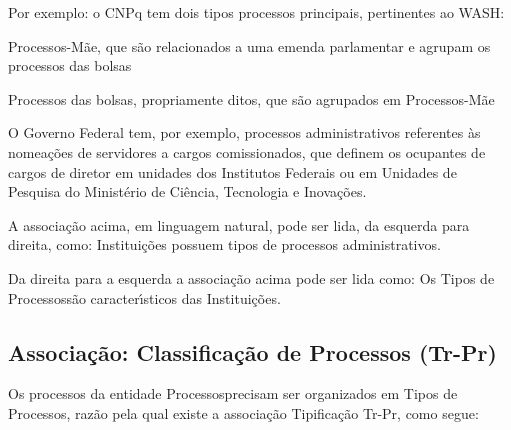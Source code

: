 \documentclass[
12pt,		%
openright,	%
twoside,  %
a4paper,			%
chapter=TITLE,		%
english,			%
french,				%
spanish,			%
brazil				%
]{USPSC-classe/USPSC}
\begin{document}
Por exemplo: o CNPq tem dois tipos processos principais, pertinentes ao WASH:










\begin{alineas}
\item Processos-M\~ae, que s\~ao relacionados a uma emenda parlamentar e agrupam os processos das bolsas
\item Processos das bolsas, propriamente ditos, que s\~ao agrupados em Processos-M\~ae
\end{alineas}

O Governo Federal tem, por exemplo, processos administrativos referentes \`as nomea\c{c}\~oes de servidores a cargos comissionados, que definem os ocupantes de cargos de diretor em unidades dos Institutos Federais ou em Unidades de Pesquisa do Minist\'erio de Ci\^encia, Tecnologia e Inova\c{c}\~oes.











A associa\c{c}\~ao acima, em linguagem natural, pode ser lida, da esquerda para direita, como: Institui\c{c}\~oes possuem tipos de processos administrativos.









Da direita para a esquerda a associa\c{c}\~ao acima pode ser lida como: Os \textquotedbl Tipos de Processos\textquotedbl  s\~ao caracter\'{\i}sticos das \textquotedbl Institui\c{c}\~oes\textquotedbl .









\subsection[Associa\c{c}\~ao: Classifica\c{c}\~ao de Processos (Tr-Pr)]{Associa\c{c}\~ao: Classifica\c{c}\~ao de Processos (Tr-Pr)}\label{Associa\c{c}\~ao: Classifica\c{c}\~ao de Processos (Tr-Pr)}
Os processos da entidade \textquotedbl Processos\textquotedbl  precisam ser organizados em \textquotedbl Tipos de Processos\textquotedbl , raz\~ao pela qual existe a associa\c{c}\~ao \textquotedbl Tipifica\c{c}\~ao Tr-Pr\textquotedbl , como segue:
\end{document}
